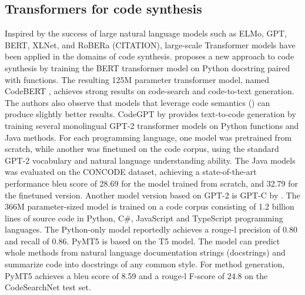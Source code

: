 \subsection{Transformers for code synthesis}
Inspired by the success of large natural language models such as ELMo, GPT, BERT, XLNet, and RoBERa (CITATION), large-scale Transformer models have been applied in the domains of code synthesis. \textcite{feng2020codebert} proposes a new approach to code synthesis by training the BERT transformer model on Python \gls{docstring} paired with functions. The resulting 125M parameter transformer model, named CodeBERT \cite{feng2020codebert}, achieves strong results on code-search and code-to-text generation. The authors also observe that models that leverage code semantics () can produce slightly better results. CodeGPT by \cite{lu2021codexglue} provides text-to-code generation by training several monolingual GPT-2 transformer models on Python functions and Java methods. For each programming language, one model was pretrained from scratch, while another was finetuned on the code corpus, using the standard GPT-2 vocabulary and natural language understanding ability. The Java models was evaluated on the CONCODE  dataset, achieving a state-of-the-art performance \acrshort{bleu} score \cite{papineni2002bleu} of 28.69 for the model trained from scratch, and 32.79 for the finetuned version. Another model version based on GPT-2 is GPT-C by \textcite{svyatkovskiy2020intellicode}. The 366M parameter-sized model is trained on a code corpus consisting of 1.2 billion lines of source code in Python, C\#, JavaScript and TypeScript programming languages. The Python-only model reportedly achieves a \gls{rouge-l} precision of 0.80 and recall of 0.86. PyMT5 \textcite{colin2020pymt5} is based on the T5 model. The model can predict whole methods from natural language documentation strings (docstrings) and summarize code into docstrings of any common style. For method generation, PyMT5 achieves a \gls{bleu} score of 8.59 and a \gls{rouge-l} F-score of 24.8 on the CodeSearchNet  test set.

